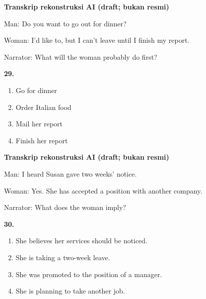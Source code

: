 \documentclass[12pt]{article}
\begin{document}
\par
\vspace{0.25\baselineskip}
\begin{exampleblock}
\textbf{Transkrip rekonstruksi AI (draft; bukan resmi)}\par
Man: Do you want to go out for dinner?\par
Woman: I'd like to, but I can't leave until I finish my report.\par
Narrator: What will the woman probably do first?\par
\end{exampleblock}
\noindent\textbf{29.}
\begin{enumerate}[label=(\Alph*),leftmargin=*,itemsep=0.2em]
\item Go for dinner
\item Order Italian food
\item Mail her report
\item Finish her report
\end{enumerate}
\par
\vspace{0.25\baselineskip}
\begin{exampleblock}
\textbf{Transkrip rekonstruksi AI (draft; bukan resmi)}\par
Man: I heard Susan gave two weeks' notice.\par
Woman: Yes. She has accepted a position with another company.\par
Narrator: What does the woman imply?\par
\end{exampleblock}
\noindent\textbf{30.}
\begin{enumerate}[label=(\Alph*),leftmargin=*,itemsep=0.2em]
\item She believes her services should be noticed.
\item She is taking a two-week leave.
\item She was promoted to the position of a manager.
\item She is planning to take another job.
\end{enumerate}
\par
\vspace{0.25\baselineskip}
\end{document}
